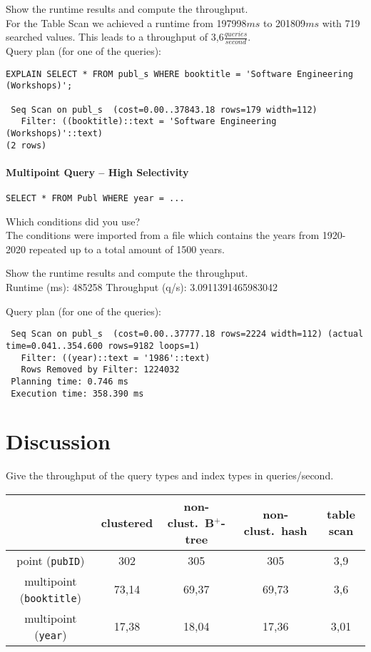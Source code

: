 \documentclass[11pt]{scrartcl}
\begin{document}
\smallskip\noindent
Show the runtime results and compute the throughput.\\
For the Table Scan we achieved a runtime from 197998$ms$ to 201809$ms$ with 719 searched values.
This leads to a throughput of 3,6$\frac{queries}{second}$.\\

\smallskip\noindent
Query plan (for one of the queries):
\begin{verbatim}
EXPLAIN SELECT * FROM publ_s WHERE booktitle = 'Software Engineering (Workshops)';

 Seq Scan on publ_s  (cost=0.00..37843.18 rows=179 width=112)
   Filter: ((booktitle)::text = 'Software Engineering (Workshops)'::text)
(2 rows)
\end{verbatim}


\paragraph{Multipoint Query -- High Selectivity}

{\small
\begin{verbatim}
SELECT * FROM Publ WHERE year = ...
\end{verbatim}
}

\noindent
Which conditions did you use?\\
The conditions were imported from a file which contains the years from 1920-2020 repeated up to a total amount of 1500 years.

\smallskip\noindent
Show the runtime results and compute the throughput.\\
Runtime (ms): 485258
Throughput (q/s): 3.0911391465983042

\smallskip\noindent
Query plan (for one of the queries):
{\small
\begin{verbatim}
 Seq Scan on publ_s  (cost=0.00..37777.18 rows=2224 width=112) (actual time=0.041..354.600 rows=9182 loops=1)
   Filter: ((year)::text = '1986'::text)
   Rows Removed by Filter: 1224032
 Planning time: 0.746 ms
 Execution time: 358.390 ms
\end{verbatim}
}

\section{Discussion}

Give the throughput of the query types and index types in queries/second.
\begin{center}
  \begin{tabular}{c|c|c|c|c}
    & clustered & non-clust.\ B$^+$-tree & non-clust.\ hash & table scan \\
    \hline
    point ({\tt pubID}) & 302 & 305 & 305 & 3,9 \\
    \hline
    multipoint ({\tt booktitle}) & 73,14 & 69,37 & 69,73 & 3,6\\
    \hline
    multipoint  ({\tt year}) & 17,38 & 18,04 & 17,36 & 3,01 \\  
  \end{tabular}
\end{center}
\end{document}
